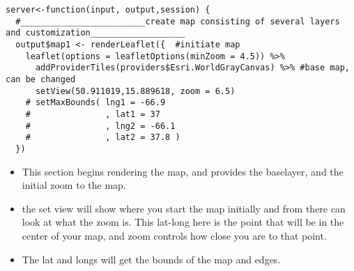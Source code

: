 \documentclass[
]{article}
\providecommand{\tightlist}{%
  \setlength{\itemsep}{0pt}\setlength{\parskip}{0pt}}
\begin{document}
\begin{verbatim}
server<-function(input, output,session) {
  #_________________________create map consisting of several layers and customization___________________
  output$map1 <- renderLeaflet({  #initiate map
    leaflet(options = leafletOptions(minZoom = 4.5)) %>%
      addProviderTiles(providers$Esri.WorldGrayCanvas) %>% #base map, can be changed
      setView(50.911019,15.889618, zoom = 6.5)
    # setMaxBounds( lng1 = -66.9
    #               , lat1 = 37
    #               , lng2 = -66.1
    #               , lat2 = 37.8 )
  })
\end{verbatim}

\begin{itemize}
\tightlist
\item
  This section begins rendering the map, and provides the baselayer, and
  the initial zoom to the map.
\item
  the set view will show where you start the map initially and from
  there can look at what the zoom is. This lat-long here is the point
  that will be in the center of your map, and zoom controls how close
  you are to that point.
\item
  The lat and longs will get the bounds of the map and edges.
\end{itemize}
\end{document}

